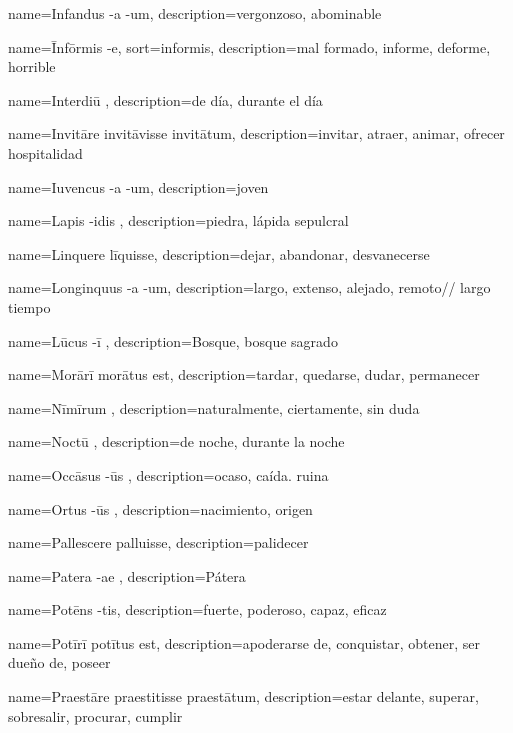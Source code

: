 {name={Infandus -a -um},
description={vergonzoso, abominable}}

{name={Īnfōrmis -e},
sort={informis},
description={mal formado, informe, deforme, horrible}}

{name={Interdiū },
description={de día, durante el día}}

{name={Invitāre invitāvisse invitātum},
description={invitar, atraer, animar, ofrecer hospitalidad}}

{name={Iuvencus -a -um},
description={joven}}

{name={Lapis -idis },
description={piedra, lápida sepulcral}}

{name={Linquere līquisse},
description={dejar, abandonar, desvanecerse}}

{name={Longinquus -a -um},
description={largo, extenso, alejado, remoto//  largo tiempo} }

{name={Lūcus -ī },
description={Bosque, bosque sagrado}}

{name={Morārī morātus est},
description={tardar, quedarse, dudar, permanecer}}

{name={Nīmīrum },
description={naturalmente, ciertamente, sin duda}}

{name={Noctū },
description={de noche, durante la noche}}

{name={Occāsus -ūs },
description={ocaso, caída. ruina}}

{name={Ortus -ūs },
description={nacimiento, origen}}

{name={Pallescere palluisse},
description={palidecer}}

{name={Patera -ae },
description={Pátera}}

{name={Potēns -tis},
description={fuerte, poderoso, capaz, eficaz}}

{name={Potīrī potītus est},
description={apoderarse de, conquistar, obtener, ser dueño de, poseer}}

{name={Praestāre praestitisse praestātum},
description={estar delante, superar, sobresalir, procurar, cumplir}}

